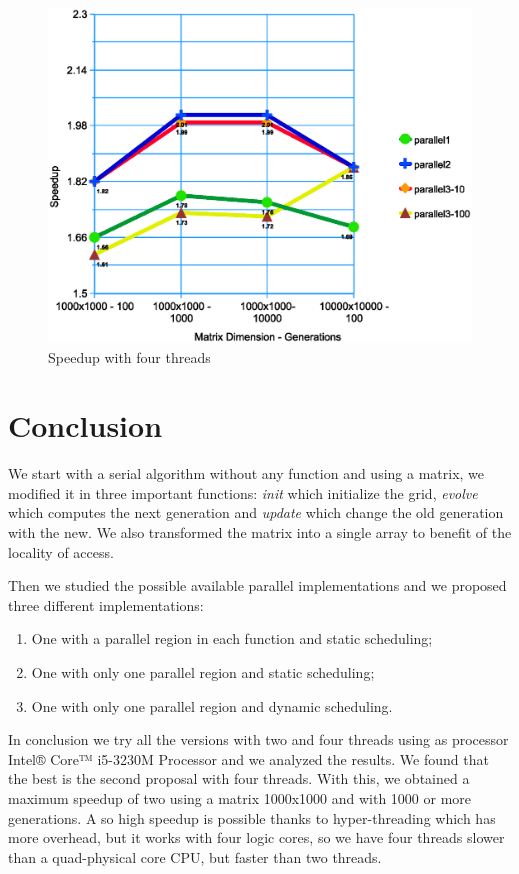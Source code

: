 \documentclass[a4paper,11pt,twoside]{report}
\begin{document}
\begin{center}
\begin{figure}
	\centering
	\includegraphics[scale = 0.5]{4.eps}
	\caption{Speedup with four threads} \label{fig:9}
\end{figure}
\end{center}

\chapter{Conclusion}
We start with a serial algorithm without any function and using a matrix, we modified it in three important functions: \emph{init} which initialize the grid, \emph{evolve} which computes the next generation and \emph{update} which change the old generation with the new. We also transformed the matrix into a single array to benefit of the locality of access.

\noindent Then we studied the possible available parallel implementations and we proposed three different implementations:
\begin{enumerate}
\item One with a parallel region in each function and static scheduling;
 \item One with only one parallel region and static scheduling;
 \item One with only one parallel region and dynamic scheduling.
\end{enumerate}
In conclusion we try all the versions with two and four threads using as processor Intel® Core™ i5-3230M Processor and we analyzed the results. We found that the best is the second proposal with four threads. With this, we obtained a maximum speedup of two using a matrix 1000x1000 and with 1000 or more generations. A so high speedup is possible thanks to hyper-threading which has more overhead, but it works with four logic cores, so we have four threads slower than a quad-physical core CPU, but faster than two threads.
\end{document}
